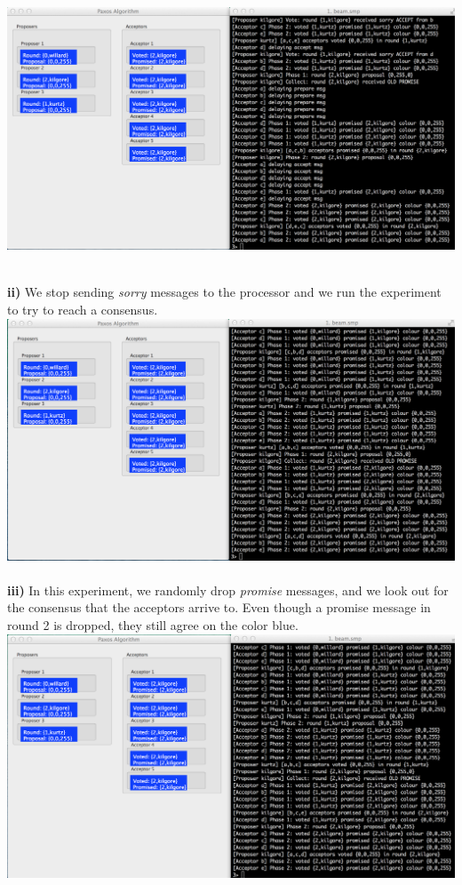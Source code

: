 \documentclass[a4paper, 11pt]{article}
\begin{document}
\includegraphics[scale=0.35]{images/exp3.png} \\\\
\newpage

\textbf{ii)} We stop sending \textit{sorry} messages to the processor and we run the experiment to try to reach a consensus.\\

\includegraphics[scale=0.35]{images/exp4.png} \\\\

\textbf{iii)} In this experiment, we randomly drop \textit{promise} messages, and we look out for the consensus that the acceptors arrive to. Even though a promise message in round 2 is dropped, they still agree on the color blue.\\

\includegraphics[scale=0.35]{images/exp5.png} \\\\
\newpage
\end{document}
